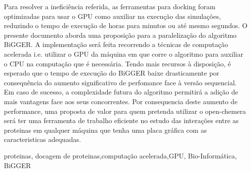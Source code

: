Para resolver a ineficiência referida, as ferramentas para docking foram optimizadas para usar o GPU como auxiliar na execução das simulações, reduzindo o tempo de execução de horas para minutos ou até mesmo segundos.
O presente documento aborda uma proposição para a paralelização do algoritmo BiGGER.
 A implementação será feita recorrendo a técnicas de computação acelerada i.e. utilizar o GPU da máquina em que corre o algoritmo para auxiliar o CPU na computação que é necessária. 
 Tendo mais recursos à disposição, é esperado que o tempo de execução do BiGGER baixe drasticamente por consequência do aumento significativo de perfomance face à versão sequencial.
Em caso de sucesso, a complexidade futura do algoritmo permitirá a adição de mais vantagens face aos seus concorrentes.
Por consequencia deste aumento de performance, uma proposta de valor para quem pretenda utilizar o open-chemera será ter uma ferramenta de trabalho eficiente no estudo das interações entre as proteinas em qualquer máquina que tenha uma placa gráfica com as caracteristicas adequadas.
%
%
%


\begin{keywords}
proteinas, docagem de proteinas,computação acelerada,GPU, Bio-Informática, BiGGER
\end{keywords}

